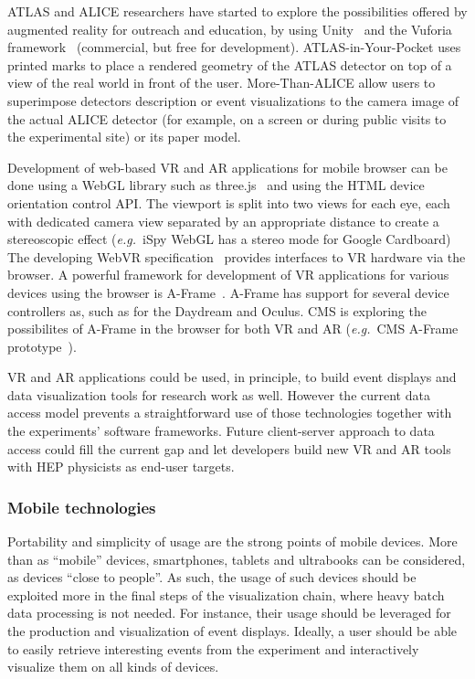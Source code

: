 \documentclass[12pt,a4paper]{article}
\begin{document}
ATLAS and ALICE researchers have started to explore the possibilities offered by augmented reality for outreach and education,
by using Unity~\cite{Unity3D} and the Vuforia framework~\cite{VuforiaAR} (commercial, but free for development). ATLAS-in-Your-Pocket
uses printed marks to place a rendered geometry of the ATLAS detector on top of a view of the real world in front of the user.
More-Than-ALICE allow users to superimpose detectors description or event visualizations to the camera image of the actual
ALICE detector (for example, on a screen or during public visits to the experimental site) or its paper model.

Development of web-based VR and AR applications for mobile browser can be done using a WebGL library such as three.js~\cite{ThreeJS} and using the
HTML device orientation control API. The viewport is split into two views for each eye, each with dedicated camera view separated
by an appropriate distance to create a stereoscopic effect ({\it e.g.}\ iSpy WebGL has a stereo mode for Google Cardboard)
The developing WebVR specification~\cite{WebVR} provides interfaces to VR hardware via the browser. A powerful framework for
development of VR applications for various devices using the browser is A-Frame~\cite{AFrame}. A-Frame has support for several device controllers as,
such as for the Daydream and Oculus. CMS is exploring the possibilites of A-Frame in the
browser for both VR and AR ({\it e.g.}\ CMS A-Frame prototype~\cite{CMSAFrame}).

VR and AR applications could be used, in principle, to build event displays and data visualization tools for research work as well.
However the current data access model prevents a straightforward use of those technologies together with the experiments' software frameworks.
Future client-server approach to data access could fill the current gap and let developers build new VR and AR tools with HEP physicists as end-user targets.

\hypertarget{mobile-tech}{%
\subsubsection{Mobile technologies}\label{mobile-tech}}

Portability and simplicity of usage are the strong points of mobile devices. More than as ``mobile'' devices, smartphones,
tablets and ultrabooks can be considered, as devices ``close to people''. As such, the usage of such devices
should be exploited more in the final steps of the visualization chain, where heavy batch data processing is not needed. For instance,
their usage should be leveraged for the production and visualization of event displays.
Ideally, a user should be able to easily retrieve interesting events from the experiment and interactively visualize them on all
kinds of devices.
\end{document}

